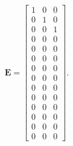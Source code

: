 \documentclass{article}
\newcommand{\mat}{\mathbf}
\begin{document}
\begin{equation}
\mat{E} = \begin{bmatrix}
1 & 0 & 0 \\
0 & 1 & 0 \\
0 & 0 & 1 \\
0 & 0 & 0 \\
0 & 0 & 0 \\
0 & 0 & 0 \\
0 & 0 & 0 \\
0 & 0 & 0 \\
0 & 0 & 0 \\
0 & 0 & 0 \\
0 & 0 & 0 \\
0 & 0 & 0 \\
0 & 0 & 0 \\
0 & 0 & 0
\end{bmatrix}.
\end{equation}
\end{document}
